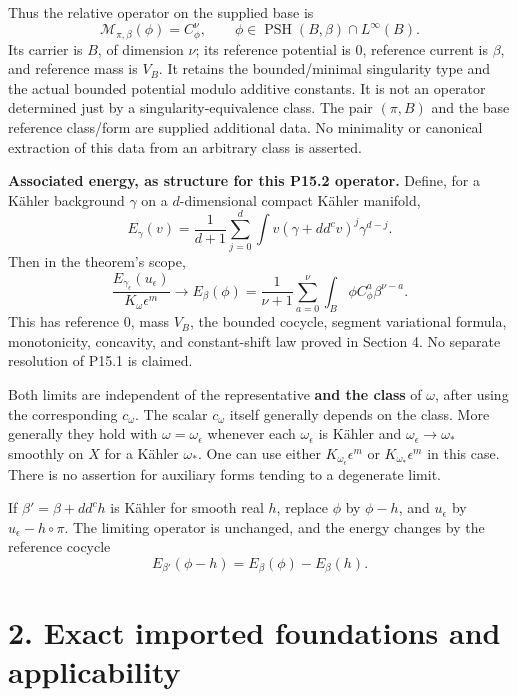 \documentclass[
  11pt,
]{article}
\begin{document}
Thus the relative operator on the supplied base is \[
\mathcal M_{\pi,\beta}(\phi)=C_\phi^\nu,
\qquad \phi\in\operatorname{PSH}(B,\beta)\cap L^\infty(B).
\] Its carrier is \(B\), of dimension \(\nu\); its reference potential is \(0\), reference current is \(\beta\), and reference mass is \(V_B\). It retains the bounded/minimal singularity type and the actual bounded potential modulo additive constants. It is not an operator determined just by a singularity-equivalence class. The pair \((\pi,B)\) and the base reference class/form are supplied additional data. No minimality or canonical extraction of this data from an arbitrary class is asserted.

\textbf{Associated energy, as structure for this P15.2 operator.} Define, for a Kähler background \(\gamma\) on a \(d\)-dimensional compact Kähler manifold, \[
E_\gamma(v)=\frac1{d+1}\sum_{j=0}^d
\int v(\gamma+dd^c v)^j\gamma^{d-j}.
\] Then in the theorem's scope, \[
\frac{E_{\gamma_\epsilon}(u_\epsilon)}{K_\omega\epsilon^m}
\longrightarrow
E_\beta(\phi)=\frac1{\nu+1}\sum_{a=0}^{\nu}
\int_B\phi C_\phi^a\beta^{\nu-a}.                                  \tag{2}
\] This has reference \(0\), mass \(V_B\), the bounded cocycle, segment variational formula, monotonicity, concavity, and constant-shift law proved in Section 4. No separate resolution of P15.1 is claimed.

Both limits are independent of the representative \textbf{and the class} of \(\omega\), after using the corresponding \(c_\omega\). The scalar \(c_\omega\) itself generally depends on the class. More generally they hold with \(\omega=\omega_\epsilon\) whenever each \(\omega_\epsilon\) is Kähler and \(\omega_\epsilon\to\omega_*\) smoothly on \(X\) for a Kähler \(\omega_*\). One can use either \(K_{\omega_\epsilon}\epsilon^m\) or \(K_{\omega_*}\epsilon^m\) in this case. There is no assertion for auxiliary forms tending to a degenerate limit.

If \(\beta'=\beta+dd^c h\) is Kähler for smooth real \(h\), replace \(\phi\) by \(\phi-h\), and \(u_\epsilon\) by \(u_\epsilon-h\circ\pi\). The limiting operator is unchanged, and the energy changes by the reference cocycle \[
E_{\beta'}(\phi-h)=E_\beta(\phi)-E_\beta(h).                           \tag{3}
\]

\section{2. Exact imported foundations and applicability}\label{exact-imported-foundations-and-applicability}
\end{document}
